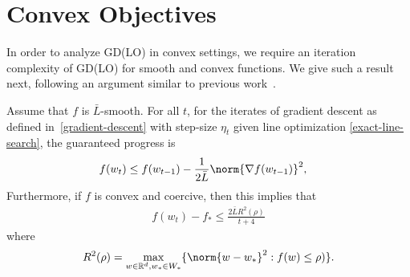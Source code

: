\documentclass[10pt]{article} %
\begin{document}
\section{Convex Objectives}\label{gd-proofs}
In order to analyze GD(LO) in convex settings, we require an iteration complexity of GD(LO) for smooth and convex functions. We give such a result next, following an argument similar to previous work~\cite[Section 3]{beck2013convergence}.
\begin{lemma}
\label{lem:GD-convex}
Assume that $f$ is $\bar{L}$-smooth. For all $t$, for the iterates of gradient descent as defined in~\eqref{gradient-descent} with step-size $\eta_t$ given line optimization \eqref{exact-line-search}, the guaranteed progress is
    \begin{align*}
        f(w_{t}) &\leq f(w_{t-1}) - \frac{1}{2\bar{L}}\norm{\nabla f(w_{t-1})}^2,
    \end{align*}  
    Furthermore, if $f$ is convex and coercive, then this implies that
    \begin{align*}
        f(w_{t}) - f_{*} \leq \frac{2\bar{L}R^2(\rho)}{t + 4}
    \end{align*} 
   where \[R^2(\rho) = \max_{w \in \mathbb{R}^d, w_{*} \in W_{*}}  \{\norm{w - w_{*}}^2 : f(w) \leq \rho)\}.\]
\end{lemma}
\end{document}
